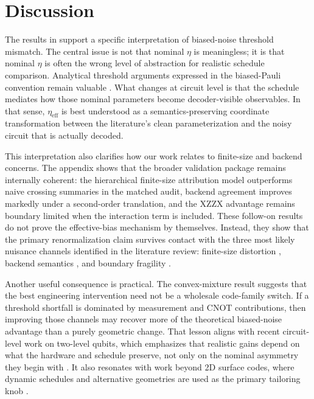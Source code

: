 \documentclass{article} %
\begin{document}
\section{Discussion}
\label{sec:discussion}

The results in  support a specific interpretation of biased-noise threshold mismatch. The central issue is not that nominal $\eta$ is meaningless; it is that nominal $\eta$ is often the wrong level of abstraction for realistic schedule comparison. Analytical threshold arguments expressed in the biased-Pauli convention remain valuable \citep{aliferis2008_biased_noise,stephens2013_topological_biased,tuckett2020_fault_tolerant_thresholds,bonilla2021_xzzx}. What changes at circuit level is that the schedule mediates how those nominal parameters become decoder-visible observables. In that sense, $\eta_{\mathrm{eff}}$ is best understood as a semantics-preserving coordinate transformation between the literature's clean parameterization and the noisy circuit that is actually decoded.

This interpretation also clarifies how our work relates to finite-size and backend concerns. The appendix shows that the broader validation package remains internally coherent: the hierarchical finite-size attribution model outperforms naive crossing summaries in the matched audit, backend agreement improves markedly under a second-order translation, and the XZZX advantage remains boundary limited when the interaction term is included. These follow-on results do not prove the effective-bias mechanism by themselves. Instead, they show that the primary renormalization claim survives contact with the three most likely nuisance channels identified in the literature review: finite-size distortion \citep{robertson2017_small_memories,xiao2024_finite_size_corrections}, backend semantics \citep{gidney2021_stim_paper,qiskit_aer_docs,pymatching_repo,higgott2025_sparse_blossom}, and boundary fragility \citep{higgott2023_improved_decoding,tsai2024_temporal_fragility}.

Another useful consequence is practical. The convex-mixture result suggests that the best engineering intervention need not be a wholesale code-family switch. If a threshold shortfall is dominated by measurement and CNOT contributions, then improving those channels may recover more of the theoretical biased-noise advantage than a purely geometric change. That lesson aligns with recent circuit-level work on two-level qubits, which emphasizes that realistic gains depend on what the hardware and schedule preserve, not only on the nominal asymmetry they begin with \citep{martinez2025_two_level_circuit}. It also resonates with work beyond 2D surface codes, where dynamic schedules and alternative geometries are used as the primary tailoring knob \citep{huang2023_3d_topological_codes,liang2025_xyz_cyclic,setiawan2025_x3z3_floquet}.
\end{document}
